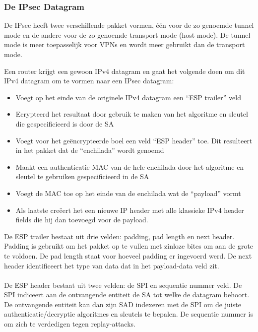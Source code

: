 \clearpage

\subsubsection{De IPsec Datagram}

De IPsec heeft twee verschillende pakket vormen, één voor de zo genoemde tunnel mode en de andere voor de zo genoemde transport mode (host mode). De tunnel mode is meer toepasselijk voor VPNs en wordt meer gebruikt dan de transport mode.

Een router krijgt een gewoon IPv4 datagram en gaat het volgende doen om dit IPv4 datagram om te vormen naar een IPsec datagram:
\begin{itemize}
\item Voegt op het einde van de originele IPv4 datagram een “ESP trailer” veld
\item Ecrypteerd het resultaat door gebruik te maken van het algoritme en sleutel die gespecificieerd is door de SA
\item Voegt voor het geëncrypteerde boel een veld “ESP header” toe. Dit resulteert in het pakket dat de “enchilada” wordt genoemd
\item Maakt een authenticatie MAC van de hele enchilada door het algoritme en sleutel te gebruiken gespecificieerd in de SA
\item Voegt de MAC toe op het einde van de enchilada wat de “payload” vormt
\item Als laatste creëert het een nieuwe IP header met alle klassieke IPv4 header fields die hij dan toevoegd voor de payload.
\end{itemize}
De ESP trailer bestaat uit drie velden: padding, pad length en next header. Padding is gebruikt om het pakket op te vullen met zinloze bites om aan de grote te voldoen. De pad length staat voor hoeveel padding er ingevoerd werd. De next header identificeert het type van data dat in het payload-data veld zit.
\\\\
De ESP header bestaat uit twee velden: de SPI en sequentie nummer veld. De SPI indiceert aan de ontvangende entiteit de SA tot welke de datagram behoort. De ontvangende entiteit kan dan zijn SAD indexeren met de SPI om de juiste authenticatie/decryptie algoritmes en sleutels te bepalen. De sequentie nummer is om zich te verdedigen tegen replay-attacks.

\clearpage

